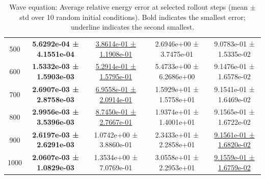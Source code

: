\documentclass{article}
\theoremstyle{plain}
\theoremstyle{definition}
\theoremstyle{remark}
\begin{document}
\begin{table}[htbp]
\begin{tabular}{ccccc}
500 & \textbf{5.6292e-04 ± 4.1551e-04} & \underline{3.8614e-01 ± 1.1908e-01} & 2.6946e+00 ± 3.7475e-01 & 9.0783e-01 ± 1.5335e-02 \\
600 & \textbf{1.5332e-03 ± 1.5903e-03} & \underline{5.2914e-01 ± 1.5795e-01} & 5.4733e+00 ± 6.2686e+00 & 9.1476e-01 ± 1.6578e-02 \\
700 & \textbf{2.6907e-03 ± 2.8758e-03} & \underline{6.9558e-01 ± 2.0914e-01} & 1.5929e+01 ± 1.5758e+01 & 9.1541e-01 ± 1.6469e-02 \\
800 & \textbf{2.9956e-03 ± 3.5396e-03} & \underline{8.7450e-01 ± 2.7667e-01} & 1.9374e+01 ± 1.4001e+01 & 9.1565e-01 ± 1.6722e-02 \\
900 & \textbf{2.6197e-03 ± 2.6291e-03} & 1.0742e+00 ± 3.8860e-01 & 2.3433e+01 ± 2.2858e+01 & \underline{9.1561e-01 ± 1.6820e-02} \\
1000& \textbf{2.0607e-03 ± 1.0829e-03} & 1.3534e+00 ± 7.0769e-01 & 3.0558e+01 ± 2.2953e+01 & \underline{9.1559e-01 ± 1.6759e-02} \\
\hline
\end{tabular}
\caption{Wave equation: Average relative energy error at selected rollout steps (mean $\pm$ std over 10 random initial conditions).
Bold indicates the smallest error; underline indicates the second smallest.}
\label{tab:sw-energy_errors_time_rows}
\end{table}
\end{document}
